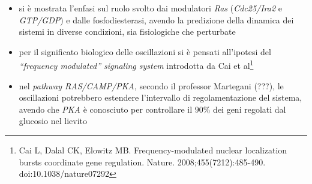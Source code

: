 \documentclass[a4paper,12pt, oneside]{book}
\begin{document}
\begin{itemize}
  \item si è mostrata l'enfasi sul ruolo svolto dai modulatori \textit{Ras}
  (\textit{Cdc25/Ira2} e \textit{GTP/GDP}) e dalle fosfodiesterasi, avendo la
  predizione della dinamica dei sistemi in diverse condizioni, sia fisiologiche
  che perturbate
  \item per il significato biologico delle oscillazioni si è pensati all'ipotesi
  del 
  \textit{``frequency modulated'' signaling system} introdotta da Cai et
  al\footnote{Cai L, Dalal CK, Elowitz MB. Frequency-modulated nuclear
    localization bursts coordinate gene
    regulation. Nature. 2008;455(7212):485-490. doi:10.1038/nature07292}  
  \item nel \textit{pathway RAS/CAMP/PKA}, secondo il professor Martegani (???),
  le 
  oscillazioni potrebbero estendere l'intervallo di regolamentazione del
  sistema, avendo che \textit{PKA} è conosciuto per controllare il $90\%$ dei
  geni regolati dal glucosio nel lievito 
\end{itemize}
\end{document}
